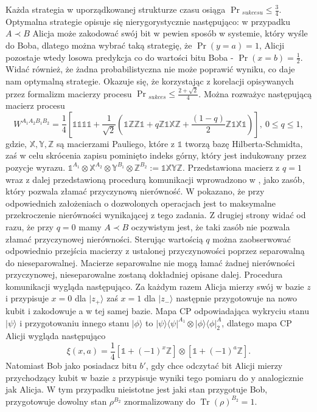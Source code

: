 \documentclass[10pt]{article} %
\DeclareMathOperator{\Trs}{Tr}
\newcommand{\Tr}[1]{\Trs(#1)}
\newcommand{\Ket}[1]{|#1\rangle}
\newcommand{\Bra}[1]{\langle#1|}
\newcommand{\WAll}{W^{A_1A_2B_1B_2}}
\newcommand{\X}{\mathbb{X}}
\newcommand{\Y}{\mathbb{Y}}
\newcommand{\Z}{\mathbb{Z}}
\newcommand{\I}{\mathbb{1}}
\begin{document}
Każda strategia w uporządkowanej strukturze czasu osiąga $\Pr{}_{sukcesu} \leq \frac{3}{4}$. Optymalna strategie opisuje się nierygorystycznie następująco: w przypadku $A \prec B$ Alicja może zakodować swój bit w pewien sposób w systemie, który wyśle do Boba, dlatego można wybrać taką strategię, że $\Pr(y=a) = 1$, Alicji pozostaje wtedy losowa predykcja co do wartości bitu Boba - $\Pr(x=b) = \frac{1}{2}$. Widać również, że żadna probabilistyczna nie może poprawić wyniku, co daje nam optymalną strategie. Okazuje się, że korzystając z korelacji opisywanych przez formalizm macierzy procesu $\Pr{}_{sukces} \leq \frac{2+\sqrt{2}}{4}$.
Można rozważyc następującą macierz procesu
\begin{equation}
\WAll = \frac{1}{4}\left[
\I\I\I\I + \frac{1}{\sqrt{2}}(\I\Z\Z\I + q\Z\I\X\Z + \frac{(1-q)}{2}\Z\I\X\I)
\right],~ 0 \leq q \leq 1,
\end{equation}
gdzie, $\X, \Y, \Z$ są macierzami Pauliego, które z $\I$ tworzą bazę Hilberta-Schmidta, zaś w celu skrócenia zapisu pominięto indeks górny, który jest indukowany przez pozycje wyrazu. $\I^{A_1} \otimes \X^{A_2} \otimes \Y^{B_1} \otimes \Z^{B_2} := \I\X\Y\Z$.
Przedstawiona macierz z $q=1$ wraz z dalej przedstawioną procedurą komunikacji wprowadzono w \cite{process_matrix}, jako zasób, który pozwala złamać przyczynową nierówność. W \cite{max_violation} pokazano, że przy odpowiednich założeniach o dozwolonych operacjach jest to maksymalne przekroczenie nierówności
wynikającej z tego zadania. Z drugiej strony widać od razu, że przy $q=0$ mamy $A \prec B$ oczywistym jest, że taki zasób nie pozwala złamać przyczynowej nierówności. Sterując wartością $q$ można zaobserwować odpowiednio przejścia macierzy z ustalonej przyczynowości poprzez separowalną do nieseparowalnej.
Macierze separowalne nie mogą łamać żadnej nierówności przyczynowej, nieseparowalne zostaną dokładniej opisane dalej. Procedura komunikacji wygląda następująco. 
Za każdym razem Alicja mierzy swój w bazie $z$ i przypisuje $x = 0$ dla $\Ket{z_+}$ zaś $x=1$ dla $\Ket{z_-}$ następnie przygotowuje na nowo kubit i zakodowuje a w tej samej bazie. Mapa CP odpowiadająca wykryciu stanu $\Ket{\psi}$ i przygotowaniu innego stanu $\Ket{\phi}$ to $\Ket{\psi}\Bra{\psi}^{A_1} \otimes
\Ket{\phi}\Bra{\phi}^A_2$, dlatego mapa CP Alicji wygląda następująco
\begin{equation}
\xi(x, a) = \frac{1}{4}
\left[
\I + (-1)^x \Z
\right]
\otimes
\left[
\I  + (-1)^a \Z
\right	].
\end{equation}
Natomiast Bob jako posiadacz bitu $b'$, gdy chce odczytać bit Alicji mierzy przychodzący kubit w bazie $z$ przypisuje wyniki tego pomiaru do y analogicznie jak Alicja. W tym przypadku nieistotne jest jaki stan przygotuje Bob, przygotowuje dowolny stan $\rho^{B_2}$ znormalizowany do $\Tr \rho^{B_2} = 1$.
\end{document}
